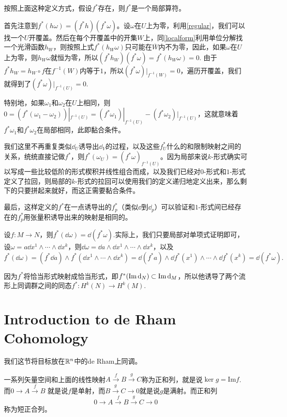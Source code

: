 \para 按照上面这种定义方式，假设$f^*$存在，则$f^*$是一个局部算符。

首先注意到$f^*(h\omega)=(f^*h)(f^*\omega)$。设$\omega$在$U$上为零，利用\eqref{regular}，我们可以找一个$U$开覆盖。然后在每个开覆盖中的开集$W$上，同\eqref{localform}利用单位分解找一个光滑函数$h_W$，则按照上式$f^*(h_W\omega)$只可能在$\overline{W}$内不为零，因此，如果$\omega$在$U$上为零，则$h_W\omega$就恒为零，所以$(f^*h_W)(f^*\omega)=f^*(h_W\omega)=0$. 由于$f^*h_W=h_W\circ f$在$f^{-1}(W)$内等于$1$，所以$(f^*\omega)|_{f^{-1}(W)}=0$，遍历开覆盖，我们就得到了$(f^*\omega)|_{f^{-1}(U)}=0$.

特别地，如果$\omega_1$和$\omega_2$在$U$上相同，则$0=(f^*(\omega_1-\omega_2))|_{f^{-1}(U)}=(f^*\omega_1)|_{f^{-1}(U)}-(f^*\omega_2)|_{f^{-1}(U)}$，这就意味着$f^*\omega_1$和$f^*\omega_2$在局部相同，此即黏合条件。

我们这里不再重复类似$\dd_U$诱导出$\dd_V$的过程，以及这些$f^*_U$什么的和限制映射之间的关系，统统直接记做$f^*$，则$f^*(\omega_{U})=(f^* \omega)_{f^{-1}(U)}$。因为局部来说$k$-形式确实可以写成一些比较低阶的形式楔积并线性组合而成，以及我们已经对$0$-形式和$1$-形式定义了拉回，则局部的$k$-形式的拉回可以使用我们的定义递归地定义出来，那么剩下的只要拼起来就好，而这正需要黏合条件。

最后，这样定义的$f^*$在一点诱导出的$f^*_p$（类似$\dd$到$\dd_p$）可以验证和$1$-形式间已经存在的$f^*_p$用张量积诱导出来的映射是相同的。

\para 设$f:M\to N$，则$f^*(\dd \omega)=\dd (f^*\omega)$.实际上，我们只要局部对单项式证明即可，设$\omega=a\dd x^{1}\wedge\cdots\wedge \dd x^{k}$，则$\dd \omega=\dd a\wedge \dd x^{1}\wedge\cdots\wedge \dd x^{k}$，以及
\[
	f^*(\dd \omega)=(f^*\dd a)\wedge f^*(\dd x^{1}\wedge\cdots\wedge \dd x^{k})=\dd (f^*a)\wedge \dd f^*(x^{1})\wedge\cdots\wedge \dd f^*(x^{k})=\dd (f^*\omega).
\]

因为$f^*$将恰当形式映射成恰当形式，即$f^*(\operatorname{Im} \mathrm{d}_N)\subset \operatorname{Im} \mathrm{d}_M$，所以他诱导了两个流形上同调群之间的同态$f^*:H^k(N)\to H^k(M)$.

\section{Introduction to de Rham Cohomology}

我们这节将目标放在$\mathbb{R}^n$中的de Rham上同调。

\para 一系列矢量空间和上面的线性映射$A\xrightarrow{f}B\xrightarrow{g}C$称为正和列，就是说$\ker g=\mathrm{Im} f$.而$0\to A\xrightarrow{f}B$
就是说$f$是单射，而$B\xrightarrow{g}C\to 0$就是说$g$是满射。而正和列
\[
0\to A\xrightarrow{f}B\xrightarrow{g}C\to 0
\]
称为短正合列。

